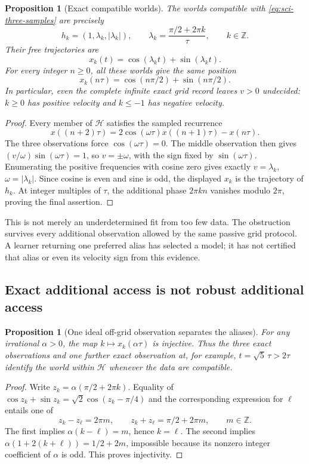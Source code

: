 \documentclass[11pt]{article}
\newtheorem{proposition}[theorem]{Proposition}
\theoremstyle{definition}
\begin{document}
\begin{proposition}[Exact compatible worlds]\label{prop:sci-alias-fiber}
The worlds compatible with \eqref{eq:sci-three-samples} are precisely
\[
 h_k=(1,\lambda_k,|\lambda_k|),\qquad
 \lambda_k=\frac{\pi/2+2\pi k}{\tau},\qquad k\in\mathbb Z.
\]
Their free trajectories are
\[
 x_k(t)=\cos(\lambda_k t)+\sin(\lambda_k t).
\]
For every integer $n\geq0$, all these worlds give the same position
\[
 x_k(n\tau)=\cos(n\pi/2)+\sin(n\pi/2).
\]
In particular, even the complete infinite exact grid record leaves
$v>0$ undecided: $k\geq0$ has positive velocity and $k\leq-1$ has
negative velocity.
\end{proposition}
\begin{proof}
Every member of $\mathcal H$ satisfies the sampled recurrence
\[
 x((n+2)\tau)=2\cos(\omega\tau)x((n+1)\tau)-x(n\tau).
\]
The three observations force $\cos(\omega\tau)=0$. The middle observation
then gives $(v/\omega)\sin(\omega\tau)=1$, so $v=\pm\omega$, with the
sign fixed by $\sin(\omega\tau)$. Enumerating the positive frequencies
with cosine zero gives exactly $v=\lambda_k$, $\omega=|\lambda_k|$.
Since cosine is even and sine is odd, the displayed $x_k$ is the trajectory
of $h_k$. At integer multiples of $\tau$, the additional phase $2\pi kn$
vanishes modulo $2\pi$, proving the final assertion.
\end{proof}

This is not merely an underdetermined fit from too few data. The obstruction
survives every additional observation allowed by the same passive grid
protocol. A learner returning one preferred alias has selected a model;
it has not certified that alias or even its velocity sign from this evidence.

\subsection{Exact additional access is not robust additional access}

\begin{proposition}[One ideal off-grid observation separates the aliases]
\label{prop:sci-irrational}
For any irrational $\alpha>0$, the map
$k\mapsto x_k(\alpha\tau)$ is injective. Thus the three exact observations
and one further exact observation at, for example, $t=\sqrt5\,\tau>2\tau$
identify the world within $\mathcal H$ whenever the data are compatible.
\end{proposition}
\begin{proof}
Write $z_k=\alpha(\pi/2+2\pi k)$. Equality of
$\cos z_k+\sin z_k=\sqrt2\cos(z_k-\pi/4)$ and the corresponding expression
for $\ell$ entails one of
\[
 z_k-z_\ell=2\pi m,
 \qquad
 z_k+z_\ell=\pi/2+2\pi m,
 \qquad m\in\mathbb Z.
\]
The first implies $\alpha(k-\ell)=m$, hence $k=\ell$.
The second implies
$\alpha(1+2(k+\ell))=1/2+2m$, impossible because its nonzero integer
coefficient of $\alpha$ is odd. This proves injectivity.
\end{proof}
\end{document}
